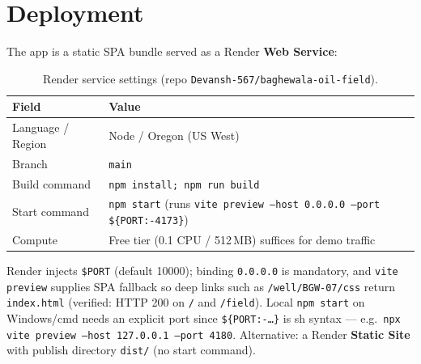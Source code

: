 \documentclass[12pt,a4paper]{report}
\begin{document}
\chapter{Deployment}
The app is a static SPA bundle served as a Render \textbf{Web Service}:
\begin{table}[h]
\centering
\caption{Render service settings (repo \texttt{Devansh-567/baghewala-oil-field}).\label{tab:render}}
\begin{tabular}{lp{9.5cm}}
\toprule
\textbf{Field} & \textbf{Value} \\ \midrule
Language / Region & Node / Oregon (US West) \\
Branch & \texttt{main} \\
Build command & \texttt{npm install; npm run build} \\
Start command & \texttt{npm start} \;(runs \texttt{vite preview --host 0.0.0.0 --port \$\{PORT:-4173\}}) \\
Compute & Free tier (0.1 CPU / 512\,MB) suffices for demo traffic \\
\bottomrule
\end{tabular}
\end{table}
Render injects \texttt{\$PORT} (default 10000); binding \texttt{0.0.0.0} is
mandatory, and \texttt{vite preview} supplies SPA fallback so deep links such
as \texttt{/well/BGW-07/css} return \texttt{index.html} (verified: HTTP 200 on
\texttt{/} and \texttt{/field}). Local \texttt{npm start} on Windows/cmd needs
an explicit port since \texttt{\$\{PORT:-\dots\}} is sh syntax --- e.g.\
\texttt{npx vite preview --host 127.0.0.1 --port 4180}. Alternative: a Render
\textbf{Static Site} with publish directory \texttt{dist/} (no start command).

\end{document}
